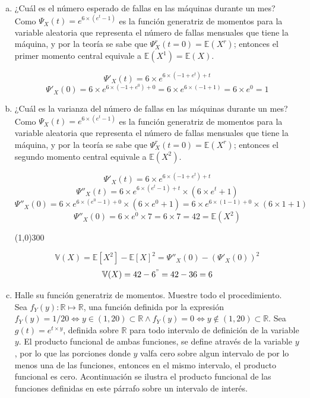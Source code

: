 \documentclass[11pt, spanish]{article}
\begin{document}
\begin{enumerate}[(a)]

\item ¿Cuál es el número esperado de fallas en las máquinas durante un mes?\\

Como $\Psi_{X}(t) = e^{6 \times \left( e ^{t} - 1 \right)}$ es la función generatriz de momentos para la variable aleatoria que representa el número de fallas mensuales que tiene la máquina, y por la teoría se sabe que $\Psi_{X}^r(t = 0) = \mathbb{E}(X^r)$; entonces el primer momento central equivale a $\mathbb{E}(X^1) = \mathbb{E}(X)$.

$$\Psi'_{X}(t) = 6 \times e ^{6 \times (-1 + e^t) + t}$$
$$\Psi'_{X}(0) = 6 \times e ^{6 \times (-1 + e^0) + 0} = 6 \times e ^{6 \times (-1 + 1)} = 6 \times e ^{0} = 1$$

\item ¿Cuál es la varianza del número de fallas en las máquinas durante un mes?\\

Como $\Psi_{X}(t) = e^{6 \times \left( e ^{t} - 1 \right)}$ es la función generatriz de momentos para la variable aleatoria que representa el número de fallas mensuales que tiene la máquina, y por la teoría se sabe que $\Psi_{X}^r(t = 0) = \mathbb{E}(X^r)$; entonces el segundo momento central equivale a $\mathbb{E}(X^2)$.

$$\Psi'_{X}(t) = 6 \times e ^{6 \times (-1 + e^t) + t}$$
$$\Psi''_{X}(t) = 6 \times e^{6 \times \left(e^t-1\right)+t} \times \left(6 \times e^t+1\right)$$
$$\Psi''_{X}(0) = 6 \times e^{6 \times \left(e^0-1\right)+0} \times \left(6 \times e^0+1\right) = 6 \times e^{6 \times \left(1-1\right)+0} \times \left(6 \times 1+1\right)$$
$$\Psi''_{X}(0) = 6 \times e^{0} \times 7 = 6 \times 7 = 42 = \mathbb{E}(X^2)$$
\begin{center}
	\line(1,0){300}
\end{center}
$$\mathbb{V}(X) = \mathbb{E}[X^2] - \mathbb{E}[X]^2 = \Psi''_{X}(0) - (\Psi'_{X}(0))^2 $$
$$\mathbb{V}(X) = 42 - 6^" = 42 - 36 = 6 $$

\item Halle su función generatriz de momentos. Muestre todo el procedimiento.\\

Sea $f_{Y}(y) : \mathbb{R} \mapsto \mathbb{R}$, una función definida por la expresión $f_{Y}(y) = 1/20 \iff y \in (1, 20) \subset \mathbb{R} \wedge f_{Y}(y) = 0 \iff y \notin (1, 20) \subset \mathbb{R}$. Sea $g(t) = e^{t \times y}$, definida sobre $\mathbb{R}$ para todo intervalo de definición de la variable $y$. El producto funcional de ambas funciones, se define através de la variable $y$, por lo que las porciones donde $y$ valfa cero sobre algun intervalo de por lo menos una de las funciones, entonces en el mismo intervalo, el producto funcional es cero. Acontinuación se ilustra el producto funcional de las funciones definidas en este párrafo sobre un intervalo de interés.


\end{enumerate}
\end{document}
